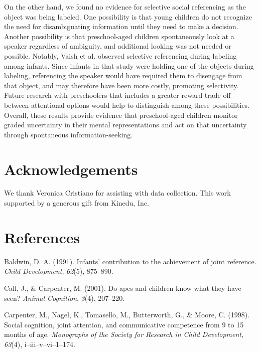 \documentclass[10pt, letterpaper]{article}
\begin{document}
On the other hand, we found no evidence for selective social referencing
as the object was being labeled. One possibility is that young children
do not recognize the need for disambiguating information until they need
to make a decision. Another possibility is that preschool-aged children
spontaneously look at a speaker regardless of ambiguity, and additional
looking was not needed or possible. Notably, Vaish et al. observed
selective referencing during labeling among infants. Since infants in
that study were holding one of the objects during labeling, referencing
the speaker would have required them to disengage from that object, and
may therefore have been more costly, promoting selectivity. Future
research with preschoolers that includes a greater reward trade off
between attentional options would help to distinguish among these
possibilities. Overall, these results provide evidence that
preschool-aged children monitor graded uncertainty in their mental
representations and act on that uncertainty through spontaneous
information-seeking.

\section{Acknowledgements}\label{acknowledgements}

We thank Veronica Cristiano for assisting with data collection. This
work supported by a generous gift from Kinedu, Inc.

\section{References}\label{references}

\setlength{\parindent}{-0.1in} \setlength{\leftskip}{0.125in} \noindent

\hypertarget{refs}{}
\hypertarget{ref-Baldwin1991}{}
Baldwin, D. A. (1991). Infants' contribution to the achievement of joint
reference. \emph{Child Development}, \emph{62}(5), 875--890.

\hypertarget{ref-Call2001}{}
Call, J., \& Carpenter, M. (2001). Do apes and children know what they
have seen? \emph{Animal Cognition}, \emph{3}(4), 207--220.

\hypertarget{ref-Carpenter1998}{}
Carpenter, M., Nagel, K., Tomasello, M., Butterworth, G., \& Moore, C.
(1998). Social cognition, joint attention, and communicative competence
from 9 to 15 months of age. \emph{Monographs of the Society for Research
in Child Development}, \emph{63}(4), i--iii--v--vi--1--174.
\end{document}

